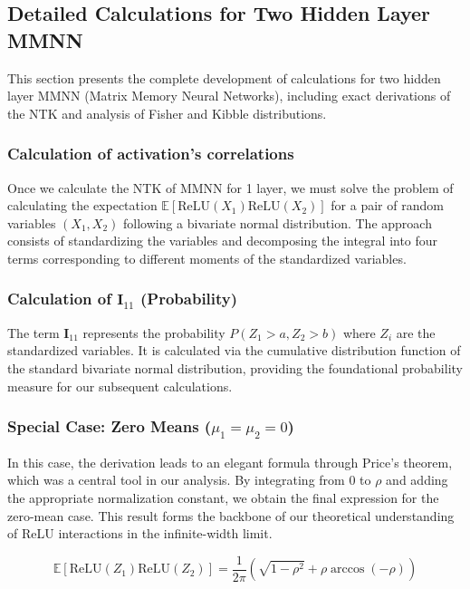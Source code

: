 \documentclass[a4paper]{article}
\newcommand{\E}{\mathbb{E}}
\newcommand{\E}{\mathbb{E}}
\theoremstyle{plain}
\theoremstyle{definition}
\theoremstyle{remark}
\begin{document}
\newpage
\subsection{Detailed Calculations for Two Hidden Layer MMNN}
\label{app:mmnn}

This section presents the complete development of calculations for two hidden layer MMNN (Matrix Memory Neural Networks), including exact derivations of the NTK and analysis of Fisher and Kibble distributions.

\subsubsection{Calculation of activation's correlations}

Once we calculate the NTK of MMNN for 1 layer, we must solve the problem of calculating the expectation $\E[\text{ReLU}(X_1)\text{ReLU}(X_2)]$ for a pair of random variables $(X_1, X_2)$ following a bivariate normal distribution. The approach consists of standardizing the variables and decomposing the integral into four terms corresponding to different moments of the standardized variables.

\subsubsection{Calculation of $\mathbf{I}_{11}$ (Probability)}

The term $\mathbf{I}_{11}$ represents the probability $P(Z_1 > a, Z_2 > b)$ where $Z_i$ are the standardized variables. It is calculated via the cumulative distribution function of the standard bivariate normal distribution, providing the foundational probability measure for our subsequent calculations.

\subsubsection{Special Case: Zero Means ($\mu_1=\mu_2=0$)}

In this case, the derivation leads to an elegant formula through Price's theorem, which was a central tool in our analysis. By integrating from $0$ to $\rho$ and adding the appropriate normalization constant, we obtain the final expression for the zero-mean case. This result forms the backbone of our theoretical understanding of ReLU interactions in the infinite-width limit.

\begin{equation}
\boxed{\E[\text{ReLU}(Z_1)\text{ReLU}(Z_2)] = \frac{1}{2\pi}(\sqrt{1-\rho^2} + \rho\arccos(-\rho))}
\end{equation}
\end{document}
